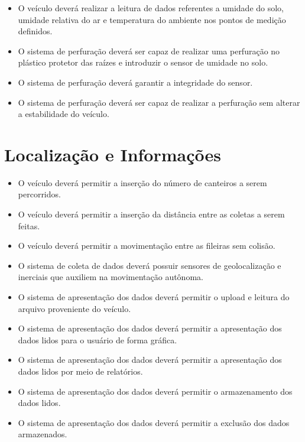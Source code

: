     \begin{itemize}
      \item O veículo deverá realizar a leitura de dados referentes a umidade do solo, umidade relativa do ar e temperatura do ambiente nos pontos de medição definidos.
      \item O sistema de perfuração deverá ser capaz de realizar uma perfuração no plástico protetor das raízes e introduzir o sensor de umidade no solo.
      \item O sistema de perfuração deverá garantir a integridade do sensor.
      \item O sistema de perfuração deverá ser capaz de realizar a perfuração sem alterar a estabilidade do veículo.
    \end{itemize}

    \section{Localização e Informações}

      \begin{itemize}
        \item O veículo deverá permitir a inserção do número de canteiros a serem percorridos.
        \item O veículo deverá permitir a inserção da distância entre as coletas a serem feitas.
        \item O veículo deverá permitir a movimentação entre as fileiras sem colisão.
        \item O sistema de coleta de dados deverá possuir sensores de geolocalização e inerciais que auxiliem na movimentação autônoma.
        \item O sistema de apresentação dos dados deverá permitir o upload e leitura do arquivo proveniente do veículo.
        \item O sistema de apresentação dos dados deverá permitir a apresentação dos dados lidos para o usuário de forma gráfica.
        \item O sistema de apresentação dos dados deverá permitir a apresentação dos dados lidos por meio de relatórios.
        \item O sistema de apresentação dos dados deverá permitir o armazenamento dos dados lidos.
        \item O sistema de apresentação dos dados deverá permitir a exclusão dos dados armazenados.
      \end{itemize}
